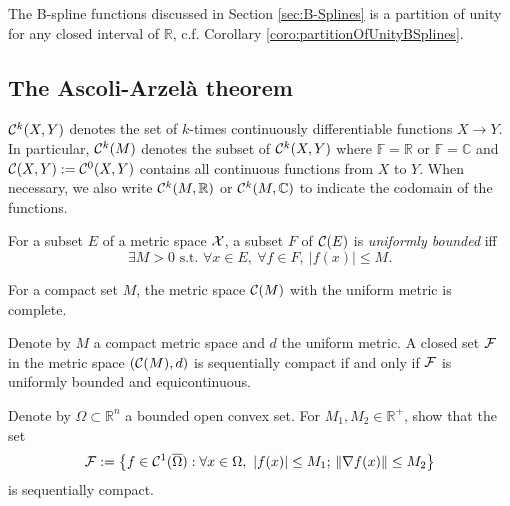 \begin{exm}
  \label{exm:B-splineAsPartOfUnity}
  The B-spline functions discussed in Section \ref{sec:B-Splines}
  is a partition of unity
  for any closed interval of $\mathbb{R}$,
  c.f. Corollary \ref{coro:partitionOfUnityBSplines}.
\end{exm}

\subsection{The Ascoli-Arzel\`{a} theorem}
\label{sec:ascoli-arzela-theor}

\begin{ntn}
  \label{ntn:setOfContinuousScalarFuncs}
  ${\cal C}^{k}(X,Y)$
  denotes the set of $k$-times continuously differentiable functions
  $X\rightarrow Y$.
  In particular, ${\cal C}^{k}(M)$
  denotes the subset of ${\cal C}^{k}(X,Y)$
  where $\mathbb{F}=\mathbb{R}$
  or $\mathbb{F}=\mathbb{C}$
  and ${\cal C}(X,Y):={\cal C}^{0}(X,Y)$
  contains all continuous functions from $X$ to $Y$.
  When necessary, we also write ${\cal C}^k(M,\mathbb{R})$
  or ${\cal C}^k(M,\mathbb{C})$
  to indicate the codomain of the functions. 
\end{ntn}

\begin{defn}
  \label{def:uniformBoundedSetInFuncMetricSpace}
  For a subset $E$ of a metric space ${\cal X}$, 
  a subset $F$ of ${\cal C}(E)$ is \emph{uniformly bounded}
  iff
  \begin{equation}
    \label{eq:uniformBoundedSetInFuncMetricSpace}
    \exists M>0 \text{ s.t. }
    \forall x\in E,\ \forall f \in F,\ 
    |f(x)| \le M.
  \end{equation}
\end{defn}

\begin{lem}
  \label{lem:completeMetricSpaceForCompactSet}
  For a compact set $M$,
  the metric space ${\cal C}(M)$
  with the uniform metric is complete.
\end{lem}

\begin{thm}
  \label{thm:Ascoli-Arzela}
  Denote by $M$ a compact metric space
  and $d$ the uniform metric. 
  A closed set ${\cal F}$ in the metric space $({\cal C}(M),d)$
  is sequentially compact
  if and only if ${\cal F}$ is uniformly bounded and equicontinuous. 
\end{thm}

\begin{exc}
  \label{exc:equiContInRn2Compact}
  Denote by $\Omega\subset \mathbb{R}^n$ a bounded open convex set.
  For $M_1,M_2\in\mathbb{R}^+$,
  show that the set
  \begin{equation}
    \label{eq:equiContInRn2Compact}
    {\cal F} := \left\{f\in {\cal C}^{1}(\overline{\Omega}) :
      \forall x\in \Omega,\ |f(x)|\le M_1;\, 
      \|\nabla f(x)\|\le M_2
    \right\}
  \end{equation}
  is sequentially compact.
\end{exc}

